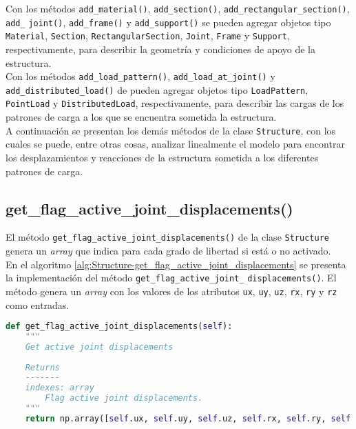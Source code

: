 Con los métodos \verb|add_material()|, \verb|add_section()|, \verb|add_rectangular_section()|, \verb|add_| \verb|joint()|, \verb|add_frame()| y \verb|add_support()| se pueden agregar objetos tipo \verb|Material|, \verb|Section|, \verb|RectangularSection|, \verb|Joint|, \verb|Frame| y \verb|Support|, respectivamente, para describir la geometría y condiciones de apoyo de la estructura.\\

Con los métodos \verb|add_load_pattern()|, \verb|add_load_at_joint()| y \verb|add_distributed_load()| de pueden agregar objetos tipo \verb|LoadPattern|, \verb|PointLoad| y \verb|DistributedLoad|, respectivamente, para describir las cargas de los patrones de carga a los que se encuentra sometida la estructura.\\

A continuación se presentan los demás métodos de la clase \verb|Structure|, con los cuales se puede, entre otras cosas, analizar linealmente el modelo para encontrar los desplazamientos y reacciones de la estructura sometida a los diferentes patrones de carga.\\

\subsection{get\_flag\_active\_joint\_displacements()}

El método \verb|get_flag_active_joint_displacements()| de la clase \verb|Structure| genera un \emph{array} que indica para cada grado de libertad si está o no activado.\\

En el algoritmo \ref{alg:Structure-get_flag_active_joint_displacements} se presenta la implementación del método \verb|get_flag_active_joint_| \verb|displacements()|. El método genera un \emph{array} con los valores de los atributos \verb|ux|, \verb|uy|, \verb|uz|, \verb|rx|, \verb|ry| y \verb|rz| como entradas.

\begin{lstlisting}[language=Python,caption=Método \texttt{get\_flag\_active\_joint\_displacements()} de la clase \texttt{Structure}.,label=alg:Structure-get_flag_active_joint_displacements, frame=single]
def get_flag_active_joint_displacements(self):
    """
    Get active joint displacements
    
    Returns
    -------
    indexes: array
        Flag active joint displacements.
    """
    return np.array([self.ux, self.uy, self.uz, self.rx, self.ry, self.rz])
\end{lstlisting}

